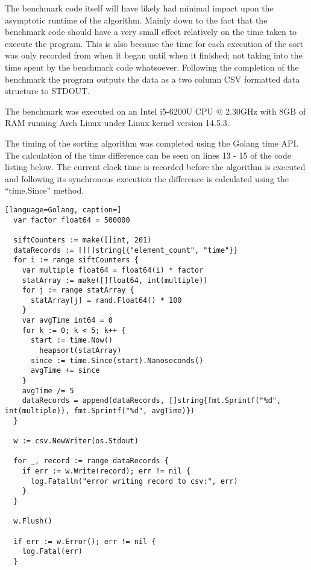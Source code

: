\documentclass{article}
\begin{document}
The benchmark code itself will have likely had minimal impact upon the asymptotic runtime of the algorithm. Mainly down to the fact that the benchmark code should have a very small effect relatively on the time taken to execute the program. This is also because the time for each execution of the sort was only recorded from when it began until when it finished; not taking into the time spent by the benchmark code whatsoever. Following the completion of the benchmark the program outputs the data as a two column CSV formatted data structure to STDOUT.

The benchmark was executed on an Intel i5-6200U CPU @ 2.30GHz with 8GB of RAM running Arch Linux under Linux kernel version 14.5.3.

The timing of the sorting algorithm was completed using the Golang time API. The calculation of the time difference can be seen on lines 13 - 15 of the code listing below. The current clock time is recorded before the algorithm is executed and following its synchronous execution the difference is calculated using the ``time.Since'' method.

\begin{lstlisting}[language=Golang, caption=]
  var factor float64 = 500000

  siftCounters := make([]int, 201)
  dataRecords := [][]string{{"element_count", "time"}}
  for i := range siftCounters {
    var multiple float64 = float64(i) * factor
    statArray := make([]float64, int(multiple))
    for j := range statArray {
      statArray[j] = rand.Float64() * 100
    }
    var avgTime int64 = 0
    for k := 0; k < 5; k++ {
      start := time.Now()
        heapsort(statArray)
      since := time.Since(start).Nanoseconds()
      avgTime += since
    }
    avgTime /= 5
    dataRecords = append(dataRecords, []string{fmt.Sprintf("%d", int(multiple)), fmt.Sprintf("%d", avgTime)})
  }

  w := csv.NewWriter(os.Stdout)

  for _, record := range dataRecords {
    if err := w.Write(record); err != nil {
      log.Fatalln("error writing record to csv:", err)
    }
  }

  w.Flush()

  if err := w.Error(); err != nil {
    log.Fatal(err)
  }
\end{lstlisting}
\end{document}
